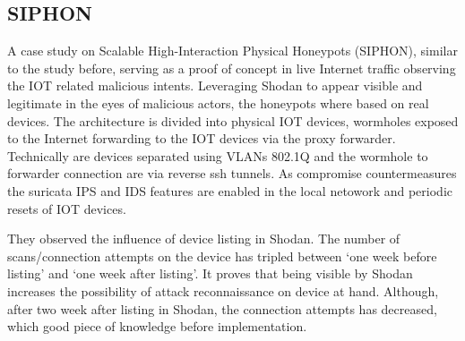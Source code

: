 \subsection{SIPHON \label{related:active-anal:siphon}}
A case study \cite{study:siphon} on Scalable High-Interaction Physical Honeypots (SIPHON), similar to the study before, serving as a proof of concept in live Internet traffic observing the IOT related malicious intents. Leveraging Shodan to appear visible and legitimate in the eyes of malicious actors, the honeypots where based on real devices. The architecture is divided into physical IOT devices, wormholes exposed to the Internet forwarding to the IOT devices via the proxy forwarder. Technically are devices separated using VLANs 802.1Q and the wormhole to forwarder connection are via reverse ssh tunnels. As compromise countermeasures the suricata IPS and IDS features are enabled in the local netowork and periodic resets of IOT devices.

They observed the influence of device listing in Shodan. The number of scans/connection attempts on the device has tripled between `one week before listing' and `one week after listing'. It proves that being visible by Shodan increases the possibility of attack reconnaissance on device at hand. Although, after two week after listing in Shodan, the connection attempts has decreased, which good piece of knowledge before implementation.